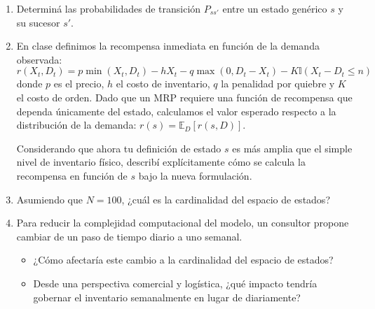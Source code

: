 \documentclass[12pt]{article}
\begin{document}
\begin{enumerate}
\begin{enumerate}
    \item Determin\'a las probabilidades de transición $P_{ss'}$ entre un estado genérico $s$ y su sucesor $s'$.
    
\item En clase definimos la recompensa inmediata en función de la demanda observada:
{\small
$$ r(X_t, D_t) = p \min(X_t, D_t) - h X_t - q \max(0, D_t - X_t) - K \mathbb{I}(X_t - D_t \leq n) $$
}donde $p$ es el precio, $h$ el costo de inventario, $q$ la penalidad por quiebre y $K$ el costo de orden. Dado que un MRP requiere una función de recompensa que dependa únicamente del estado, calculamos el valor esperado respecto a la distribuci\'on de la demanda: $r(s) = \mathbb{E}_D[r(s, D)]$. 

Considerando que ahora tu definición de estado $s$ es más amplia que el simple nivel de inventario físico, describí explícitamente cómo se calcula la recompensa en funci\'on de $s$ bajo la nueva formulación.
    
    \item Asumiendo que $N = 100$, ¿cuál es la cardinalidad del espacio de estados? 
    
    \item Para reducir la complejidad computacional del modelo, un consultor propone cambiar de un paso de tiempo diario a uno semanal. 
    \begin{itemize}
        \item ¿Cómo afectaría este cambio a la cardinalidad del espacio de estados?
        \item Desde una perspectiva comercial y logística, ¿qué impacto  tendría gobernar el inventario semanalmente en lugar de diariamente?
    \end{itemize}
\end{enumerate}

\end{enumerate}
\end{document}
